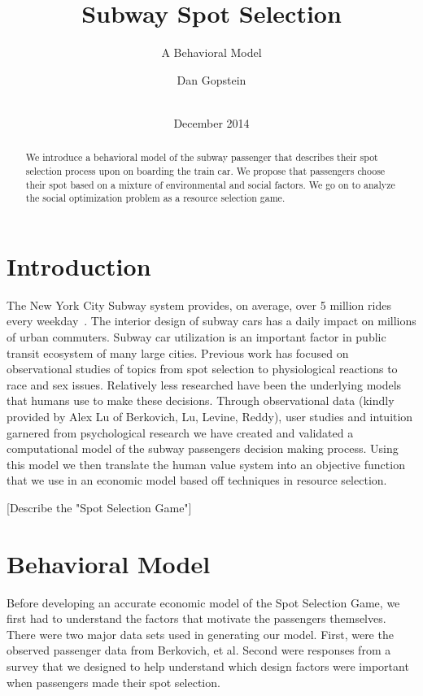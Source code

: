 \documentclass{acm_proc_article-sp}
\begin{document}
\title{Subway Spot Selection}
\subtitle{A Behavioral Model}

\author{
\alignauthor
       Dan Gopstein\\
       \\
}

\date{December 2014}


\maketitle
\begin{abstract}
We introduce a behavioral model of the subway passenger that describes their spot selection process upon on boarding the train car. We propose that passengers choose their spot based on a mixture of environmental and social factors. We go on to analyze the social optimization problem as a resource selection game.
\end{abstract}

\section{Introduction}
The New York City Subway system provides, on average, over 5 million rides every weekday~\cite{MTAFacts}. The interior design of subway cars has a daily impact on millions of urban commuters. Subway car utilization is an important factor in public transit ecosystem of many large cities. Previous work has focused on observational studies of topics from spot selection\cite{berkovich2013observed} to physiological reactions\cite{evans2007crowding} to race\cite{maines1979ecological} and sex\cite{hai1982sex} issues. Relatively less researched have been the underlying models that humans use to make these decisions. Through observational data (kindly provided by Alex Lu of Berkovich, Lu, Levine, Reddy), user studies and intuition garnered from psychological research\cite{evans2007crowding, hai1982sex, maines1979ecological} we have created and validated a computational model of the subway passengers decision making process. Using this model we then translate the human value system into an objective function that we use in an economic model based off techniques in resource selection.

[Describe the "Spot Selection Game"]

\section{Behavioral Model}
Before developing an accurate economic model of the Spot Selection Game, we first had to understand the factors that motivate the passengers themselves. There were two major data sets used in generating our model. First, were the observed passenger data from Berkovich, et al. Second were responses from a survey that we designed to help understand which design factors were important when passengers made their spot selection.
\end{document}
